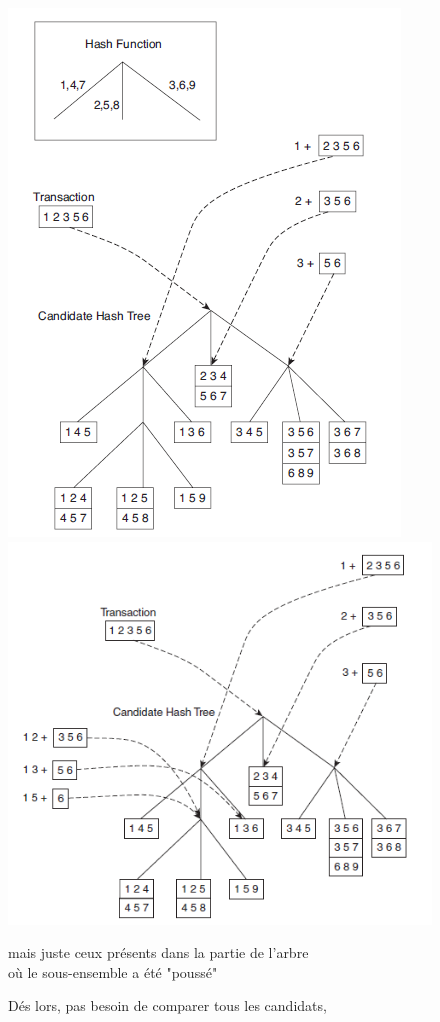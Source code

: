 \documentclass[letterpaper, 12pt]{article}
\begin{document}
			\begin{figure}[H]
				\centering
				\includegraphics[scale=0.7]{Images/support_tree}
				\includegraphics[scale=0.7]{Images/support_tree2}
				\caption{Dés lors, pas besoin de comparer tous les candidats,}
						 mais juste ceux présents dans la partie de l'arbre\\
						 où le sous-ensemble a été "poussé"
				\label{fig:support:tree}
			\end{figure}\noindent
\end{document}
